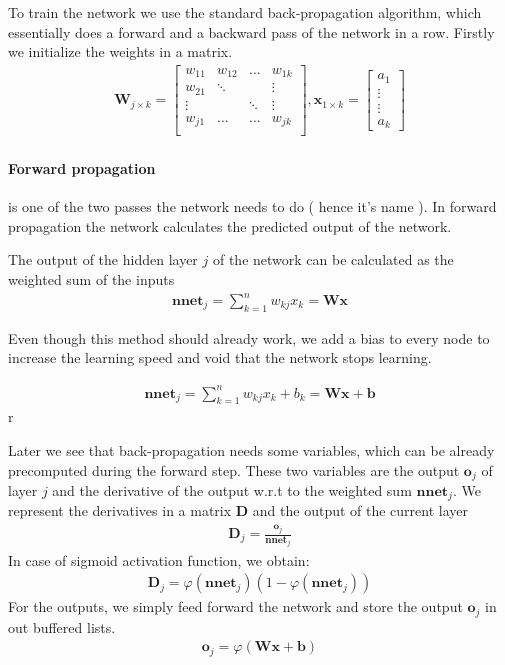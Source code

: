 To train the network we use the standard back-propagation algorithm, which essentially does a forward and a backward pass of the network in a row.
Firstly we initialize the weights in a matrix. 
\begin{align}
\mathbf{W}_{j \times k } = \begin{bmatrix}
w_{11} & w_{12} & \ldots & w_{1k}\\
w_{21} & \ddots & & \vdots\\
\vdots & & \ddots  & \vdots\\
w_{j1} & \ldots & \ldots  & w_{jk}\\
\end{bmatrix},
\mathbf{x}_{1 \times k} = \begin{bmatrix}
a_{1} \\
\vdots\\
\vdots \\
a_{k}
\end{bmatrix}
\end{align}


\paragraph{Forward propagation} is one of the two passes the network needs to do ( hence it's name ).
In forward propagation the network calculates the predicted output of the network.

The output of the hidden layer $j$ of the network can be calculated as the weighted sum of the inputs
\begin{align}
\mathbf{nnet}_j = \sum_{k=1}^{n}w_{kj}x_k = \mathbf{W} \mathbf{x}
\end{align}

Even though this method should already work, we add a bias to every node to increase the learning speed and void that the network stops learning.

\begin{align}
\mathbf{nnet}_j = \sum_{k=1}^{n}w_{kj}x_k + b_k = \mathbf{W} \mathbf{x} + \mathbf{b}
\end{align}r


Later we see that back-propagation needs some variables, which can be already precomputed during the forward step. These two variables are the output $\mathbf{o}_j$ of layer $j$ and the derivative of the output w.r.t to the weighted sum $\mathbf{nnet}_j$. We represent the derivatives in a matrix $\mathbf{D}$ and the output of the current layer 
\begin{align}
\mathbf{D}_j = \frac{\mathbf{o}_j}{\mathbf{nnet}_j}
\end{align}
In case of sigmoid activation function, we obtain:
\begin{align}
\mathbf{D}_j = \varphi \left( \mathbf{nnet}_j \right) \left( 1 - \varphi \left(\mathbf{nnet}_j \right) \right)
\end{align}
For the outputs, we simply feed forward the network and store the output $\mathbf{o}_j$ in out buffered lists.
\begin{align}
\mathbf{o}_j = \varphi \left( \mathbf{Wx+b} \right)
\end{align}

